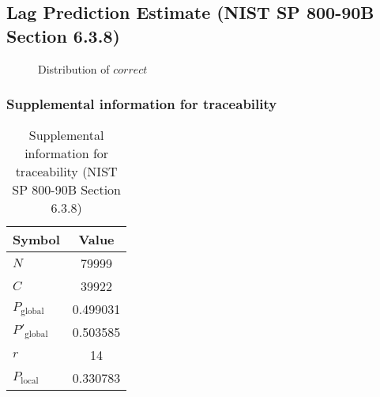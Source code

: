 \documentclass[a3paper,xelatex,english]{bxjsarticle}
\begin{document}
\subsection{Lag Prediction Estimate (NIST SP 800-90B Section 6.3.8)}
\begin{figure}[htbp]
\centering

\caption{Distribution of $correct$}
\end{figure}
\subsubsection{Supplemental information for traceability}
\renewcommand{\arraystretch}{1.8}
\begin{table}[h]
\caption{Supplemental information for traceability (NIST SP 800-90B Section 6.3.8)}
\begin{center}
\begin{tabular}{|l|c|}
\hline 
\rowcolor{anotherlightblue} %
Symbol				& Value \\ \hline 
$N$				& 79999\\ \hline 
$C$				& 39922\\ \hline 
$P_{\textrm{global}}$				& 0.499031\\ \hline 
$P'_{\textrm{global}}$			& 0.503585\\ \hline 
$r$				& 14\\ \hline 
$P_{\textrm{local}}$ 			& 0.330783\\ \hline
\end{tabular}
\end{center}
\end{table}
\renewcommand{\arraystretch}{1.4}
\clearpage
\end{document}
